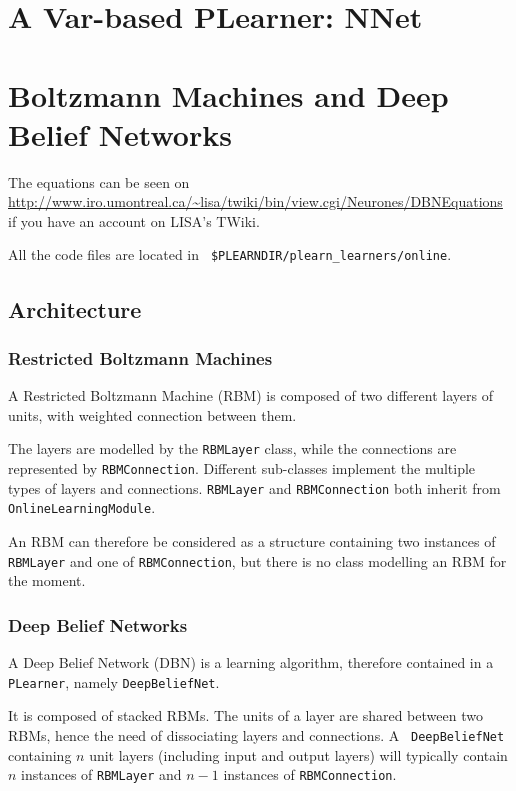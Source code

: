 \documentclass[11pt]{book}
\begin{document}
\chapter{A Var-based PLearner: NNet}

\chapter{Boltzmann Machines and Deep Belief Networks}

The equations can be seen on
\url{http://www.iro.umontreal.ca/~lisa/twiki/bin/view.cgi/Neurones/DBNEquations}
if you have an account on LISA's TWiki.

All the code files are located in {\tt
\$PLEARNDIR/plearn\_learners/online}.

\section{Architecture}

\subsection{Restricted Boltzmann Machines}

A Restricted Boltzmann Machine (RBM) is composed of two different layers
of units, with weighted connection between them.

The layers are modelled by the {\tt RBMLayer} class, while the
connections are represented by {\tt RBMConnection}. Different
sub-classes implement the multiple types of layers and connections.
{\tt RBMLayer} and {\tt RBMConnection} both inherit from {\tt
OnlineLearningModule}.

An RBM can therefore be considered as a structure containing two
instances of {\tt RBMLayer} and one of {\tt RBMConnection}, but there is
no class modelling an RBM for the moment.

\subsection{Deep Belief Networks}

A Deep Belief Network (DBN) is a learning algorithm, therefore contained
in a {\tt PLearner}, namely {\tt DeepBeliefNet}.

It is composed of stacked RBMs. The units of a layer are shared between
two RBMs, hence the need of dissociating layers and connections. A {\tt
DeepBeliefNet} containing $n$ unit layers (including input and output
layers) will typically contain $n$ instances of {\tt RBMLayer} and $n-1$
instances of {\tt RBMConnection}.
\end{document}
